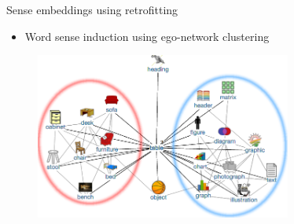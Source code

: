 \documentclass{beamer}
\begin{document}
\begin{frame}{Sense embeddings using retrofitting}

\begin{itemize}
\item Word sense induction using  ego-network clustering
\end{itemize} 
	
\centering
\begin{figure}
\includegraphics[width=0.75\textwidth]{table}
\end{figure}

\end{frame}
\end{document}
